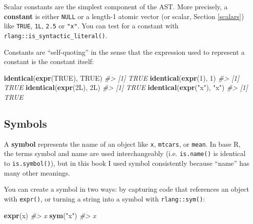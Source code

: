 \documentclass[]{book}
\makeatletter
\newenvironment{Shaded}{\begin{snugshade}}{\end{snugshade}}
\newcommand{\CommentTok}[1]{\textcolor[rgb]{0.37,0.37,0.37}{\textit{#1}}}
\newcommand{\DecValTok}[1]{\textcolor[rgb]{0.06,0.06,0.06}{#1}}
\newcommand{\KeywordTok}[1]{\textcolor[rgb]{0.27,0.27,0.27}{\textbf{#1}}}
\newcommand{\NormalTok}[1]{#1}
\newcommand{\OtherTok}[1]{\textcolor[rgb]{0.37,0.37,0.37}{#1}}
\newcommand{\StringTok}[1]{\textcolor[rgb]{0.5,0.5,0.5}{#1}}
\newcommand{\indexc}[1]{\index{#1@\texttt{#1}}}
\makeatother
\begin{document}

Scalar constants are the simplest component of the AST. More precisely, a \textbf{constant} is either \texttt{NULL} or a length-1 atomic vector (or scalar, Section \ref{scalars}) like \texttt{TRUE}, \texttt{1L}, \texttt{2.5} or \texttt{"x"}. You can test for a constant with \texttt{rlang::is\_syntactic\_literal()}.

Constants are ``self-quoting'' in the sense that the expression used to represent a constant is the constant itself:

\begin{Shaded}
\begin{Highlighting}[]
\KeywordTok{identical}\NormalTok{(}\KeywordTok{expr}\NormalTok{(}\OtherTok{TRUE}\NormalTok{), }\OtherTok{TRUE}\NormalTok{)}
\CommentTok{#> [1] TRUE}
\KeywordTok{identical}\NormalTok{(}\KeywordTok{expr}\NormalTok{(}\DecValTok{1}\NormalTok{), }\DecValTok{1}\NormalTok{)}
\CommentTok{#> [1] TRUE}
\KeywordTok{identical}\NormalTok{(}\KeywordTok{expr}\NormalTok{(2L), 2L)}
\CommentTok{#> [1] TRUE}
\KeywordTok{identical}\NormalTok{(}\KeywordTok{expr}\NormalTok{(}\StringTok{"x"}\NormalTok{), }\StringTok{"x"}\NormalTok{)}
\CommentTok{#> [1] TRUE}
\end{Highlighting}
\end{Shaded}

\hypertarget{symbols}{%
\subsection{Symbols}\label{symbols}}

\indexc{sym()}

A \textbf{symbol} represents the name of an object like \texttt{x}, \texttt{mtcars}, or \texttt{mean}. In base R, the terms symbol and name are used interchangeably (i.e. \texttt{is.name()} is identical to \texttt{is.symbol()}), but in this book I used symbol consistently because ``name'' has many other meanings.

You can create a symbol in two ways: by capturing code that references an object with \texttt{expr()}, or turning a string into a symbol with \texttt{rlang::sym()}:

\begin{Shaded}
\begin{Highlighting}[]
\KeywordTok{expr}\NormalTok{(x)}
\CommentTok{#> x}
\KeywordTok{sym}\NormalTok{(}\StringTok{"x"}\NormalTok{)}
\CommentTok{#> x}
\end{Highlighting}
\end{Shaded}
\end{document}
